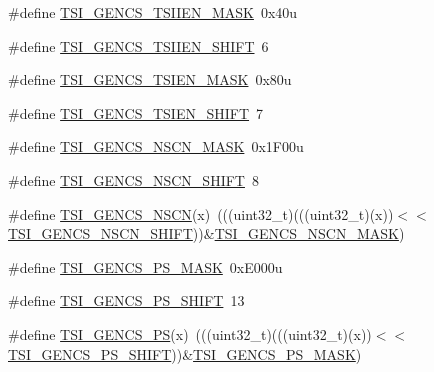 \begin{DoxyCompactItemize}
\item 
\#define \hyperlink{group___t_s_i___register___masks_gab0858eebe3e9aafb69f43b4547681aa4}{T\+S\+I\+\_\+\+G\+E\+N\+C\+S\+\_\+\+T\+S\+I\+I\+E\+N\+\_\+\+M\+A\+SK}~0x40u
\item 
\#define \hyperlink{group___t_s_i___register___masks_ga484d481ffbcbe5d9199e848658c66cc7}{T\+S\+I\+\_\+\+G\+E\+N\+C\+S\+\_\+\+T\+S\+I\+I\+E\+N\+\_\+\+S\+H\+I\+FT}~6
\item 
\#define \hyperlink{group___t_s_i___register___masks_gafa7ce02781bc0e3d369d9a00a77b480f}{T\+S\+I\+\_\+\+G\+E\+N\+C\+S\+\_\+\+T\+S\+I\+E\+N\+\_\+\+M\+A\+SK}~0x80u
\item 
\#define \hyperlink{group___t_s_i___register___masks_ga503402dbca8eec965cad561df32e7cf5}{T\+S\+I\+\_\+\+G\+E\+N\+C\+S\+\_\+\+T\+S\+I\+E\+N\+\_\+\+S\+H\+I\+FT}~7
\item 
\#define \hyperlink{group___t_s_i___register___masks_ga3a420e0ae200374eca1a185b535cc0ba}{T\+S\+I\+\_\+\+G\+E\+N\+C\+S\+\_\+\+N\+S\+C\+N\+\_\+\+M\+A\+SK}~0x1\+F00u
\item 
\#define \hyperlink{group___t_s_i___register___masks_gab90732bc69449d59a0fc0f3c208caf21}{T\+S\+I\+\_\+\+G\+E\+N\+C\+S\+\_\+\+N\+S\+C\+N\+\_\+\+S\+H\+I\+FT}~8
\item 
\#define \hyperlink{group___t_s_i___register___masks_gad18125542d6e5cebc57833da32c13668}{T\+S\+I\+\_\+\+G\+E\+N\+C\+S\+\_\+\+N\+S\+CN}(x)~(((uint32\+\_\+t)(((uint32\+\_\+t)(x))$<$$<$\hyperlink{group___t_s_i___register___masks_gab90732bc69449d59a0fc0f3c208caf21}{T\+S\+I\+\_\+\+G\+E\+N\+C\+S\+\_\+\+N\+S\+C\+N\+\_\+\+S\+H\+I\+FT}))\&\hyperlink{group___t_s_i___register___masks_ga3a420e0ae200374eca1a185b535cc0ba}{T\+S\+I\+\_\+\+G\+E\+N\+C\+S\+\_\+\+N\+S\+C\+N\+\_\+\+M\+A\+SK})
\item 
\#define \hyperlink{group___t_s_i___register___masks_ga3c608c250c31872d206e9c18eea97799}{T\+S\+I\+\_\+\+G\+E\+N\+C\+S\+\_\+\+P\+S\+\_\+\+M\+A\+SK}~0x\+E000u
\item 
\#define \hyperlink{group___t_s_i___register___masks_gaae1f3b081a9c92fefe10bd3ec1f40734}{T\+S\+I\+\_\+\+G\+E\+N\+C\+S\+\_\+\+P\+S\+\_\+\+S\+H\+I\+FT}~13
\item 
\#define \hyperlink{group___t_s_i___register___masks_ga0562bb631fc7da30eaf08301b5430d53}{T\+S\+I\+\_\+\+G\+E\+N\+C\+S\+\_\+\+PS}(x)~(((uint32\+\_\+t)(((uint32\+\_\+t)(x))$<$$<$\hyperlink{group___t_s_i___register___masks_gaae1f3b081a9c92fefe10bd3ec1f40734}{T\+S\+I\+\_\+\+G\+E\+N\+C\+S\+\_\+\+P\+S\+\_\+\+S\+H\+I\+FT}))\&\hyperlink{group___t_s_i___register___masks_ga3c608c250c31872d206e9c18eea97799}{T\+S\+I\+\_\+\+G\+E\+N\+C\+S\+\_\+\+P\+S\+\_\+\+M\+A\+SK})

\end{DoxyCompactItemize}
